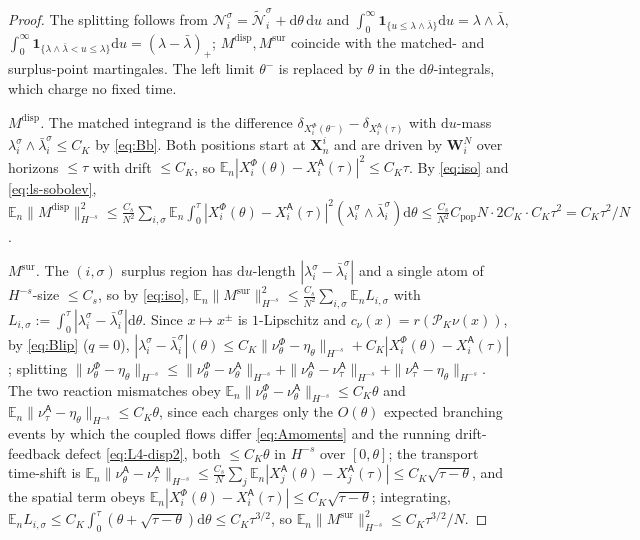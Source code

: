 \documentclass[a4paper,fleqn]{cas-sc}
\theoremstyle{definition}
\theoremstyle{remark}
\begin{document}
\begin{proof}
The splitting follows from $\mathcal N^\sigma_i=\widetilde{\mathcal N}^\sigma_i+\mathrm d\theta\,\mathrm du$
and $\int_0^\infty\mathbf 1_{\{u\le\lambda\wedge\bar\lambda\}}\mathrm du=\lambda\wedge\bar\lambda$,
$\int_0^\infty\mathbf 1_{\{\lambda\wedge\bar\lambda<u\le\lambda\}}\mathrm du=(\lambda-\bar\lambda)_+$;
$M^{\mathrm{disp}},M^{\mathrm{sur}}$ coincide with the matched- and surplus-point
martingales. The left limit $\theta^-$ is replaced by $\theta$ in the
$\mathrm d\theta$-integrals, which charge no fixed time.

\emph{$M^{\mathrm{disp}}$.} The matched integrand is the difference
$\delta_{X^\Phi_i(\theta^-)}-\delta_{X^{\mathsf A}_i(\tau)}$ with $\mathrm du$-mass
$\lambda^\sigma_i\wedge\bar\lambda^\sigma_i\le C_K$ by \eqref{eq:Bb}. Both positions start
at $\mathbf X^i_n$ and are driven by $\mathbf W^N_i$ over horizons $\le\tau$ with drift
$\le C_K$, so $\mathbb E_n|X^\Phi_i(\theta)-X^{\mathsf A}_i(\tau)|^2\le C_K\tau$. By
\eqref{eq:iso} and \eqref{eq:ls-sobolev},
$\mathbb E_n\|M^{\mathrm{disp}}\|_{H^{-s}}^2
\le\frac{C_s}{N^2}\sum_{i,\sigma}\mathbb E_n\int_0^\tau|X^\Phi_i(\theta)-X^{\mathsf A}_i(\tau)|^2(\lambda^\sigma_i\wedge\bar\lambda^\sigma_i)\mathrm d\theta
\le\frac{C_s}{N^2}C_{\mathrm{pop}}N\cdot2C_K\cdot C_K\tau^2=C_K\tau^2/N$.

\emph{$M^{\mathrm{sur}}$.} The $(i,\sigma)$ surplus region has $\mathrm du$-length
$|\lambda^\sigma_i-\bar\lambda^\sigma_i|$ and a single atom of $H^{-s}$-size $\le C_s$, so by
\eqref{eq:iso}, $\mathbb E_n\|M^{\mathrm{sur}}\|_{H^{-s}}^2\le\frac{C_s}{N^2}\sum_{i,\sigma}\mathbb E_n L_{i,\sigma}$
with $L_{i,\sigma}:=\int_0^\tau|\lambda^\sigma_i-\bar\lambda^\sigma_i|\mathrm d\theta$. Since
$x\mapsto x^\pm$ is $1$-Lipschitz and $c_\nu(x)=r(\mathcal P_K\nu(x))$, by \eqref{eq:Blip}
($q=0$),
$|\lambda^\sigma_i-\bar\lambda^\sigma_i|(\theta)\le C_K\|\nu^\Phi_\theta-\eta_\theta\|_{H^{-s}}+C_K|X^\Phi_i(\theta)-X^{\mathsf A}_i(\tau)|$;
splitting $\|\nu^\Phi_\theta-\eta_\theta\|_{H^{-s}}\le\|\nu^\Phi_\theta-\nu^{\mathsf A}_\theta\|_{H^{-s}}+\|\nu^{\mathsf A}_\theta-\nu^{\mathsf A}_\tau\|_{H^{-s}}+\|\nu^{\mathsf A}_\tau-\eta_\theta\|_{H^{-s}}$.
The two reaction mismatches obey $\mathbb E_n\|\nu^\Phi_\theta-\nu^{\mathsf A}_\theta\|_{H^{-s}}\le C_K\theta$ and
$\mathbb E_n\|\nu^{\mathsf A}_\tau-\eta_\theta\|_{H^{-s}}\le C_K\theta$, since each charges only the $O(\theta)$
expected branching events by which the coupled flows differ \eqref{eq:Amoments} and the running
drift-feedback defect \eqref{eq:L4-disp2}, both $\le C_K\theta$ in $H^{-s}$ over $[0,\theta]$; the
transport time-shift is
$\mathbb E_n\|\nu^{\mathsf A}_\theta-\nu^{\mathsf A}_\tau\|_{H^{-s}}\le\frac{C_s}{N}\sum_j\mathbb E_n|X^{\mathsf A}_j(\theta)-X^{\mathsf A}_j(\tau)|\le C_K\sqrt{\tau-\theta}$,
and the spatial term obeys $\mathbb E_n|X^\Phi_i(\theta)-X^{\mathsf A}_i(\tau)|\le C_K\sqrt{\tau-\theta}$;
integrating, $\mathbb E_n L_{i,\sigma}\le C_K\int_0^\tau(\theta+\sqrt{\tau-\theta})\mathrm d\theta\le C_K\tau^{3/2}$,
so $\mathbb E_n\|M^{\mathrm{sur}}\|_{H^{-s}}^2\le C_K\tau^{3/2}/N$.


\end{proof}
\end{document}
